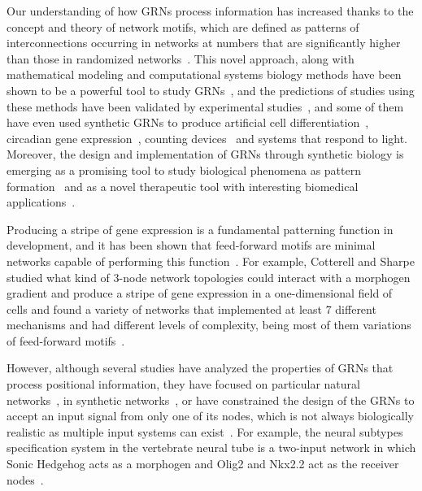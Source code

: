 \documentclass[10pt,letterpaper]{article}
\begin{document}
Our understanding of how GRNs process information has increased thanks to the
concept and theory of network motifs, which are defined as patterns of
interconnections occurring in networks at numbers that are significantly higher
than those in randomized networks~\cite{Milo2002}. This novel approach, along
with mathematical modeling and computational systems biology methods have been
shown to be a powerful tool to study GRNs~\cite{kitano_computational_2002}, and
the predictions of studies using these methods have been validated by
experimental studies~\cite{Kalir2005,Kalir2004,Mangan2003a,ODonnell2005}, and
some of them have even used synthetic GRNs to produce artificial cell
differentiation~\cite{Basu2005}, circadian gene
expression~\cite{atkinson_development_2003}, counting
devices~\cite{friedland_synthetic_2009} and systems that respond to light.
Moreover, the design and implementation of GRNs through synthetic biology is
emerging as a promising tool to study biological phenomena as pattern
formation~\cite{santos-moreno_using_2019} and as a novel therapeutic tool with
interesting biomedical applications~\cite{karlsson_therapeutic_2012,
higashikuni_advancing_2017,abil_synthetic_2015,healy_genetic_2019,
kitada_programming_2018}.

Producing a stripe of gene expression is a fundamental patterning function
in development, and it has been shown that feed-forward motifs are minimal
networks capable of performing this function~\cite{munteanu_2014}. For example,
Cotterell and Sharpe studied what kind of 3-node network topologies could
interact with a morphogen gradient and produce a stripe of gene expression
in a one-dimensional field of cells and found a variety of networks that
implemented at least 7 different mechanisms and had different levels of
complexity, being most of them variations of feed-forward motifs~\cite{Cotterell2010}.

However, although several studies have analyzed the properties of GRNs that
process positional information, they have focused on particular natural
networks~\cite{Schaerli2014,Jaeger2004}, in synthetic networks~\cite{Basu2005,
Reinitz1995,Schaerli2018,Elowitz2000}, or have constrained the
design of the GRNs to accept an input signal from only one of its nodes, which is
not always biologically realistic as multiple input systems can exist~\cite{Cotterell2010,
munteanu_2014, Schaerli2014}. For example, the neural subtypes specification
system in the vertebrate neural tube is a two-input network in which
Sonic Hedgehog acts as a morphogen and Olig2 and Nkx2.2 act as the receiver
nodes~\cite{dessaud_dynamic_2010, balaskas2012, exelby_2021}.
\end{document}
